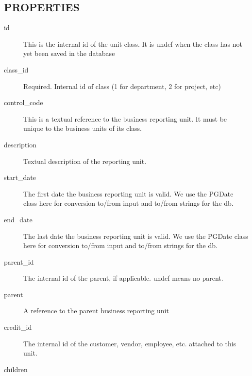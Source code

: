 \begin{description}
\begin{description}
\begin{description}
\begin{description}
\begin{description}
\begin{description}
\begin{description}
\begin{description}
\begin{description}
\begin{description}
\subsection*{PROPERTIES\label{LedgerSMB::DBObject::Business_Unit_Class_PROPERTIES}}
\begin{description}

\item[{id}] \mbox{}

This is the internal id of the unit class.  It is undef when the class has not
yet been saved in the database


\item[{class\_id}] \mbox{}

Required. Internal id of class (1 for department, 2 for project, etc)


\item[{control\_code}] \mbox{}

This is a textual reference to the business reporting unit.  It must be unique
to the business units of its class.


\item[{description}] \mbox{}

Textual description of the reporting unit.


\item[{start\_date}] \mbox{}

The first date the business reporting unit is valid.  We use the PGDate class
here for conversion to/from input and to/from strings for the db.


\item[{end\_date}] \mbox{}

The last date the business reporting unit is valid.  We use the PGDate class
here for conversion to/from input and to/from strings for the db.


\item[{parent\_id}] \mbox{}

The internal id of the parent, if applicable.  undef means no parent.


\item[{parent}] \mbox{}

A reference to the parent business reporting unit


\item[{credit\_id}] \mbox{}

The internal id of the customer, vendor, employee, etc. attached to this 
unit.


\item[{children}] \mbox{}


\end{description}
\end{description}
\end{description}
\end{description}
\end{description}
\end{description}
\end{description}
\end{description}
\end{description}
\end{description}
\end{description}
